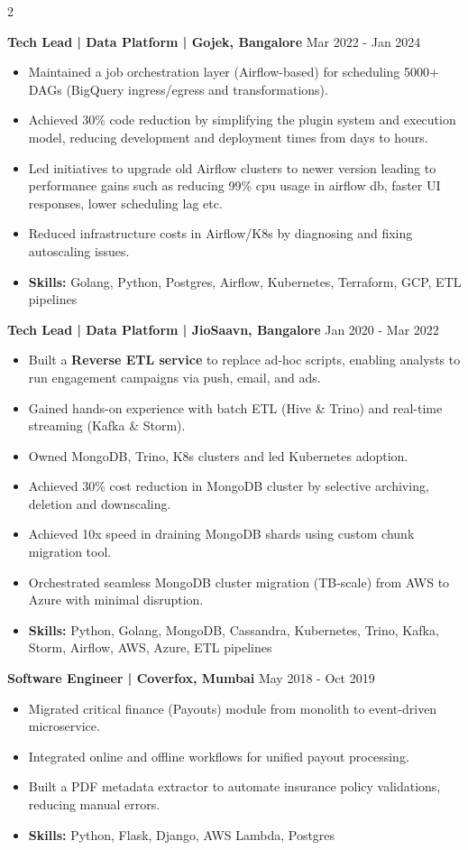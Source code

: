 \documentclass[a4paper,10pt]{article}
\newcommand{\experience}[2]{
  \vspace{0.8em}%
  \textbf{#1} \hfill #2
}
\begin{document}
\begin{paracol}{2}
\experience{Tech Lead | Data Platform | Gojek, Bangalore}{Mar 2022 - Jan 2024}
\vspace{0.2em}
\begin{itemize}
\setlength{\leftskip}{1em}
    \item Maintained a job orchestration layer (Airflow-based) for scheduling 5000+ DAGs (BigQuery ingress/egress and transformations).
    \item Achieved 30\% code reduction by simplifying the plugin system and execution model, reducing development and deployment times from days to hours.
    \item Led initiatives to upgrade old Airflow clusters to newer version leading to performance gains such as reducing 99\% cpu usage in airflow db, faster UI responses, lower scheduling lag etc.
    \item Reduced infrastructure costs in Airflow/K8s by diagnosing and fixing autoscaling issues.
    \item \textbf{Skills:} Golang, Python, Postgres, Airflow, Kubernetes, Terraform, GCP, ETL pipelines
\end{itemize}
\experience{Tech Lead | Data Platform | JioSaavn, Bangalore}{Jan 2020 - Mar 2022}
\vspace{0.2em}
\begin{itemize}
\setlength{\leftskip}{1em}
    \item Built a \textbf{Reverse ETL service} to replace ad-hoc scripts, enabling analysts to run engagement campaigns via push, email, and ads.
    \item Gained hands-on experience with batch ETL (Hive \& Trino) and real-time streaming (Kafka \& Storm).
    \item Owned MongoDB, Trino, K8s clusters and led Kubernetes adoption.
    \item Achieved 30\% cost reduction in MongoDB cluster by selective archiving, deletion and downscaling. 
    \item Achieved 10x speed in draining MongoDB shards using custom chunk migration tool.
    \item Orchestrated seamless MongoDB cluster migration (TB-scale) from AWS to Azure with minimal disruption.
    \item \textbf{Skills:} Python, Golang, MongoDB, Cassandra, Kubernetes, Trino, Kafka, Storm, Airflow, AWS, Azure, ETL pipelines
\end{itemize}
\experience{Software Engineer | Coverfox, Mumbai}{May 2018 - Oct 2019}
\vspace{0.2em}
\begin{itemize}
\setlength{\leftskip}{1em}
    \item Migrated critical finance (Payouts) module from monolith to event-driven microservice.
    \item Integrated online and offline workflows for unified payout processing.
    \item Built a PDF metadata extractor to automate insurance policy validations, reducing manual errors.
    \item \textbf{Skills:} Python, Flask, Django, AWS Lambda, Postgres
\end{itemize}


\end{paracol}
\end{document}
